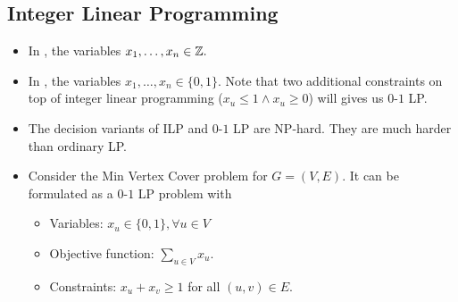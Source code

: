 \documentclass[a4paper,12pt]{article}
\begin{document}
\subsection{Integer Linear Programming}
\begin{itemize}
    \item In , the variables $x_1,\dots,x_n\in\mathbb{Z}.$
    \item In , the variables $x_1,\dots,x_n\in\{0,1\}.$ Note that two additional constraints on top of integer linear programming ($x_u\leq1\land x_u\geq0$) will gives us $0$-$1$ LP.
    \item The decision variants of ILP and $0$-$1$ LP are NP-hard. They are much harder than ordinary LP.
    \item Consider the Min Vertex Cover problem for $G=(V,E)$. It can be formulated as a $0$-$1$ LP problem with \begin{itemize}
        \item Variables: $x_u\in\{0,1\},\forall u\in V$
        \item Objective function: $\sum_{u\in V}x_u.$
        \item Constraints: $x_u+x_v\geq 1$ for all $(u,v)\in E.$
    \end{itemize}
\end{itemize}
\end{document}
